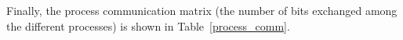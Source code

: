 %
\begin{comment}
%
During this Thesis some assumptions were made, one of this considers the RAM and ROM processes size equal each others. In future more specific analysis will be made regarding the SW and HW estimation values. In this Thesis the values shown in Table~\ref{area_proc_occ} have been used as Area Occupation metric. \par
%
\begin{table}[htbp]
\caption{Process Area Occupations.}
\begin{center}
\resizebox{0.45\hsize}{!}{$%
\begin{tabular}{c||c|c|c|c|c|c|c|c} %
\hline
\backslashbox{Proc.}{Area} & RAM & ROM & eqG  \\
\hline\hline
 $ps_1$ & 740B  & 60B  & 50   \\ \hline
 $ps_2$ & 1080B & 45B  & 50   \\ \hline
 $ps_3$ & 740B  & 26B  & 50   \\ \hline
 $ps_4$ & 1340B & 110B & 50   \\ \hline
 $ps_5$ & 1080B & 80B  & 50   \\ \hline
 $ps_6$ & 740B  & 50B  & 50   \\ \hline
 $ps_7$ & 1100B & 6B   & 50   \\ \hline
 $ps_8$ & 720B  & 5B   & 5   \\ 
\hline\hline
\end{tabular}
$%
} 
\label{area_proc_occ}
\end{center}
\end{table}
%
\end{comment}
Finally, the process communication matrix (the number of bits exchanged among the different processes) is shown in Table~\ref{process_comm}. \par
%

